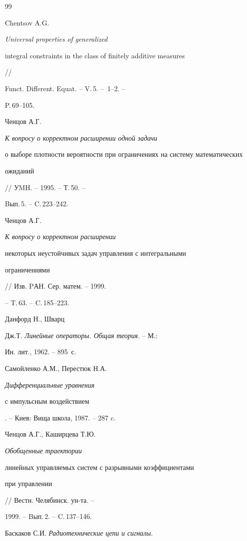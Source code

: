 \begin{thebibliography}{99}


Chentsov A.G.


{\em Universal properties of generalized


integral constraints in the class of finitely additive measures} //


Funct. Different. Equat. -- V.\,5. -- \No\,1--2. --


P.\,69--105.





 Ченцов А.Г. {\em К вопросу о корректном расширении одной задачи


о выборе плотности вероятности при ограничениях на систему математических


ожиданий} // УMH. -- 1995. -- Т.\,50. --


Bып.\,5. -- C.\,223--242.





 Ченцов А.Г. {\em К вопросу о корректном расширении


некоторых неустойчивых задач управления с интегральными


ограничениями} // Изв. PАН. Сер. матем. -- 1999.


-- T.\,63. -- C.\,185--223.





 Данфорд Н., Шварц


Дж.Т. {\em Линейные операторы. Общая теория}. -- М.:


Ин. лит., 1962. -- 895~с.





 Самойленко А.М., Перестюк Н.А. {\em Дифференциальные уравнения


с импульсным воздействием}. -- Киев: Вища школа, 1987. -- 287 c.





 Ченцов А.Г., Каширцева Т.Ю. {\em Обобщенные траектории


линейных управляемых систем с разрывными коэффициентами


при управлении} // Вестн. Челябинск. ун-та. --


1999. -- Bып.\,2. -- C.\,137--146.





 Баскаков С.И. {\em Радиотехнические цепи и сигналы}.



\end{thebibliography}
